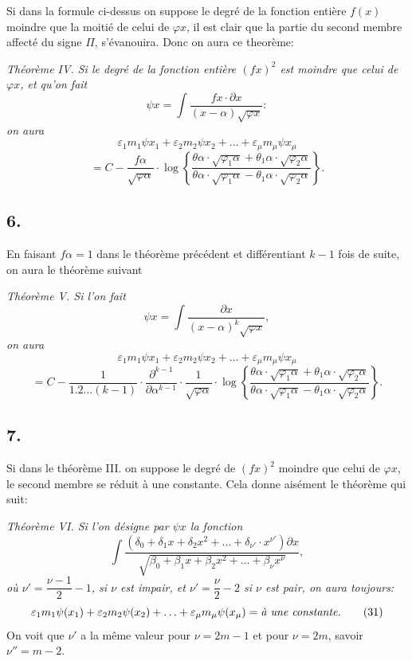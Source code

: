 \documentclass{article}
\begin{document}
Si dans la formule ci-dessus on suppose le degré de la fonction entière $f(x)$ moindre que la moitié de celui de $\varphi x$, il est clair que la partie du second membre affecté du signe $\Pi$, s'évanouira. Donc on aura ce theorème:

\emph{Théorème IV. Si le degré de la fonction entière $(fx)^{2}$ est moindre que celui de $\varphi x$, et qu'on fait}
\[ \psi x = \int \frac{fx \cdot \partial x}{(x-\alpha)\sqrt{\varphi x}}: \]
\emph{on aura}
\[ \varepsilon_1 m_1\psi x_1 + \varepsilon_2 m_2\psi x_2 + \ldots + \varepsilon_\mu m_\mu\psi x_\mu \tag{30} \]
\[ = C - \frac{f\alpha}{\sqrt{\varphi\alpha}} \cdot \log\left\{\frac{\theta\alpha \cdot \sqrt{\varphi_1\alpha}+\theta_1\alpha \cdot \sqrt{\varphi_2\alpha}}{\theta\alpha \cdot \sqrt{\varphi_1\alpha}-\theta_1\alpha \cdot \sqrt{\varphi_2\alpha}}\right\}. \]

\subsection*{6.}

En faisant $f\alpha = 1$ dans le théorème précédent et différentiant $k-1$ fois de suite, on aura le théorème suivant

\emph{Théorème V. Si l'on fait}
\[ \psi x = \int \frac{\partial x}{(x-\alpha)^{k}\sqrt{\varphi x}}, \]
\emph{on aura}
\[ \varepsilon_1 m_1\psi x_1 + \varepsilon_2 m_2\psi x_2 + \ldots + \varepsilon_\mu m_\mu\psi x_\mu \]
\[ = C - \frac{1}{1.2\ldots(k-1)} \cdot \frac{\partial^{k-1}}{\partial\alpha^{k-1}} \cdot \frac{1}{\sqrt{\varphi\alpha}} \cdot \log\left\{\frac{\theta\alpha \cdot \sqrt{\varphi_1\alpha}+\theta_1\alpha \cdot \sqrt{\varphi_2\alpha}}{\theta\alpha \cdot \sqrt{\varphi_1\alpha}-\theta_1\alpha \cdot \sqrt{\varphi_2\alpha}}\right\}. \]

\subsection*{7.}

Si dans le théorème III. on suppose le degré de $(fx)^{2}$ moindre que celui de $\varphi x$, le second membre se réduit à une constante. Cela donne aisément le théorème qui suit:

\emph{Théorème VI. Si l'on désigne par $\psi x$ la fonction}
\[ \int \frac{(\delta_0+\delta_1 x+\delta_2 x^{2}+\ldots+\delta_{\nu'} \cdot x^{\nu'})\partial x}{\sqrt{\beta_0+\beta_1 x+\beta_2 x^{2}+\ldots+\beta_\nu x^{\nu}}}, \]
\emph{où $\nu' = \dfrac{\nu-1}{2}-1$, si $\nu$ est impair, et $\nu' = \dfrac{\nu}{2}-2$ si $\nu$ est pair, on aura toujours:}
\[ \varepsilon_1 m_1\psi(x_1) + \varepsilon_2 m_2\psi(x_2) + \ldots + \varepsilon_\mu m_\mu\psi(x_\mu) = \text{\textit{à une constante.}} \tag{31} \]
On voit que $\nu'$ a la même valeur pour $\nu = 2m-1$ et pour $\nu = 2m$, savoir $\nu'' = m-2$.
\end{document}
